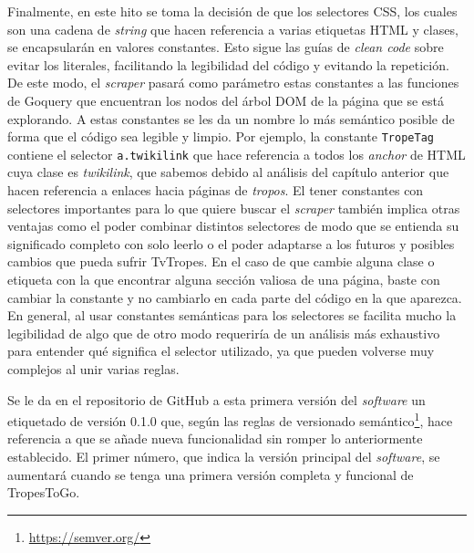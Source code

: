 Finalmente, en este hito se toma la decisión de que los selectores CSS, los
cuales son una cadena de \textit{string} que hacen referencia a varias etiquetas
HTML y clases, se encapsularán en valores constantes. Esto sigue las guías de
\textit{clean code} sobre evitar los literales, facilitando la legibilidad del
código y evitando la repetición. De este modo, el \textit{scraper} pasará como
parámetro estas constantes a las funciones de Goquery que encuentran los nodos
del árbol DOM de la página que se está explorando. A estas constantes se les da
un nombre lo más semántico posible de forma que el código sea legible y limpio.
Por ejemplo, la constante \texttt{TropeTag} contiene el selector \texttt{a.twikilink} que 
hace referencia a todos los \textit{anchor} de HTML cuya clase es
\textit{twikilink}, que sabemos debido al análisis del capítulo anterior que
hacen referencia a enlaces hacia páginas de \textit{tropos}. El tener constantes
con selectores importantes para lo que quiere buscar el \textit{scraper} también
implica otras ventajas como el poder combinar distintos selectores de modo que
se entienda su significado completo con solo leerlo o el poder adaptarse a los
futuros y posibles cambios que pueda sufrir TvTropes. En el caso de que cambie
alguna clase o etiqueta con la que encontrar alguna sección valiosa de una
página, baste con cambiar la constante y no cambiarlo en cada parte del código
en la que aparezca. En general, al usar constantes semánticas para los
selectores se facilita mucho la legibilidad de algo que de otro modo requeriría
de un análisis más exhaustivo para entender qué significa el selector utilizado,
ya que pueden volverse muy complejos al unir varias reglas.

Se le da en el repositorio de GitHub a esta primera versión del
\textit{software} un etiquetado de versión 0.1.0 que, según las reglas de
versionado semántico\footnote{\url{https://semver.org/}}, hace referencia a que
se añade nueva funcionalidad sin romper lo anteriormente establecido. El primer
número, que indica la versión principal del \textit{software}, se aumentará
cuando se tenga una primera versión completa y funcional de TropesToGo.

